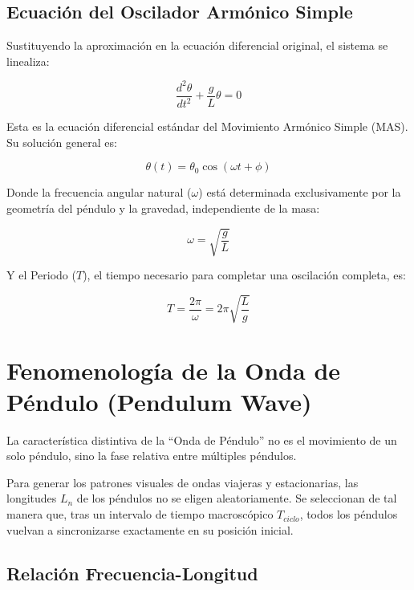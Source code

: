 \documentclass[12pt, a4paper]{article}
\begin{document}
	\subsection{Ecuación del Oscilador Armónico Simple}
	
	Sustituyendo la aproximación en la ecuación diferencial original, el sistema se linealiza:
	
	\begin{equation}
		\frac{d^2\theta}{dt^2} + \frac{g}{L} \theta = 0
	\end{equation}
	
	Esta es la ecuación diferencial estándar del Movimiento Armónico Simple (MAS). Su solución general es:
	
	\begin{equation}
		\theta(t) = \theta_0 \cos(\omega t + \phi)
	\end{equation}
	
	Donde la frecuencia angular natural ($\omega$) está determinada exclusivamente por la geometría del péndulo y la gravedad, independiente de la masa:
	
	\begin{equation}
		\omega = \sqrt{\frac{g}{L}}
	\end{equation}
	
	Y el Periodo ($T$), el tiempo necesario para completar una oscilación completa, es:
	
	\begin{equation}
		T = \frac{2\pi}{\omega} = 2\pi \sqrt{\frac{L}{g}}
	\end{equation}
	
	\section{Fenomenología de la Onda de Péndulo (Pendulum Wave)}
	
	La característica distintiva de la ``Onda de Péndulo'' no es el movimiento de un solo péndulo, sino la fase relativa entre múltiples péndulos. 
	
	Para generar los patrones visuales de ondas viajeras y estacionarias, las longitudes $L_n$ de los péndulos no se eligen aleatoriamente. Se seleccionan de tal manera que, tras un intervalo de tiempo macroscópico $T_{ciclo}$, todos los péndulos vuelvan a sincronizarse exactamente en su posición inicial.
	
	\subsection{Relación Frecuencia-Longitud}
	
\end{document}
